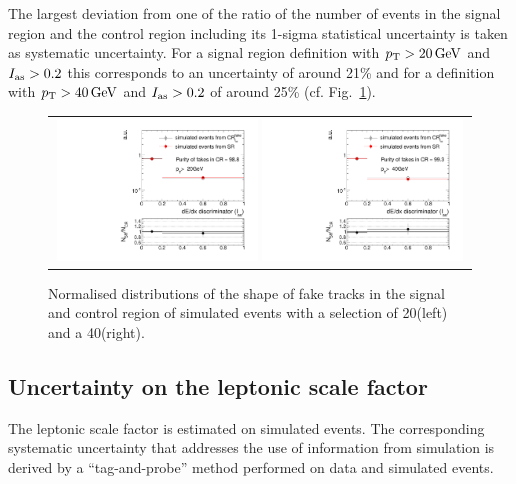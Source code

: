 The largest deviation from one of the ratio of the number of events in the signal region and the control region including its 1-sigma statistical uncertainty is taken as systematic uncertainty.
For a signal region definition with $p_{\text{T}}>20\,\text{Ge}\kern-0.06667em\text{V}$ and $I_{\text{as}}>0.2$ this corresponds to an uncertainty of around 21\% and for a definition with $p_{\text{T}}>40\,\text{Ge}\kern-0.06667em\text{V}$ and $I_{\text{as}}>0.2$ of around 25\% (cf. Fig.~\ref{fig:FakeIasUnc}).
\begin{figure}[!h]
  \centering 
  \begin{tabular}{c}
    \includegraphics[width=0.49\textwidth]{figures/analysis/Background/hASmi_SRbinning_fakes_ECalaoLe5_trackPtGt20.pdf}
    \includegraphics[width=0.49\textwidth]{figures/analysis/Background/hASmi_SRbinning_fakes_ECalaoLe5_trackPtGt40.pdf}
  \end{tabular}
  \caption{Normalised distributions of the \ias shape of fake tracks in the signal and control region of simulated \WJets events with a \pt selection of 20\gev (left) and a 40\gev (right).}
  \label{fig:FakeIasUnc}
\end{figure}

\subsection{Uncertainty on the leptonic scale factor}
\label{sec:LeptonScaleUncertainty}

The leptonic scale factor \leptonscalefactor is estimated on simulated \WJets events.
The corresponding systematic uncertainty that addresses the use of information from simulation is derived by a ``tag-and-probe'' method performed on data and simulated events.

